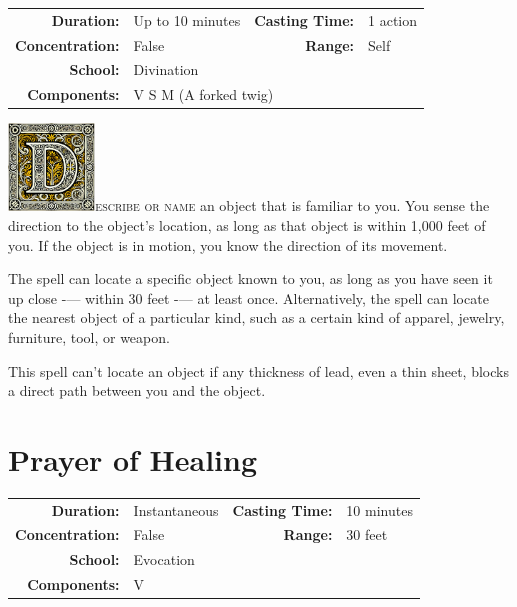 \documentclass[12pt,showtrims]{memoir}
\begin{document}
{
\small\centering\vspace{-6pt}
\begin{tabular}{rlrl}
\toprule
\textbf{Duration:} & Up to 10 minutes &
\textbf{Casting Time:} & 1 action \\
\textbf{Concentration:} & False &
\textbf{Range:} & Self \\
\textbf{School:} & Divination \\
\textbf{Components:} & \multicolumn{3}{p{0.7\textwidth}}{V S M (A forked twig)}\\
\bottomrule
\end{tabular}
}
\vspace{1\baselineskip}\noindent 
\lettrine[lines=4]{\includegraphics[height=66pt]{initials/D.png}}{escribe or name} an object that is familiar to you. You sense the direction to the object’s location, as long as that object is within 1,000 feet of you. If the object is in motion, you know the direction of its movement.

The spell can locate a specific object known to you, as long as you have seen it up close -— within 30 feet -— at least once. Alternatively, the spell can locate the nearest object of a particular kind, such as a certain kind of apparel, jewelry, furniture, tool, or weapon.

This spell can’t locate an object if any thickness of lead, even a thin sheet, blocks a direct path between you and the object.

\newpage
{}
\newpage

\section*{Prayer of Healing}

{
\small\centering\vspace{-6pt}
\begin{tabular}{rlrl}
\toprule

\textbf{Duration:} & Instantaneous &
\textbf{Casting Time:} & 10 minutes \\
\textbf{Concentration:} & False &
\textbf{Range:} & 30 feet \\
\textbf{School:} & Evocation \\
\textbf{Components:} & \multicolumn{3}{p{0.7\textwidth}}{V}\\

\bottomrule
\end{tabular}
}
\end{document}

